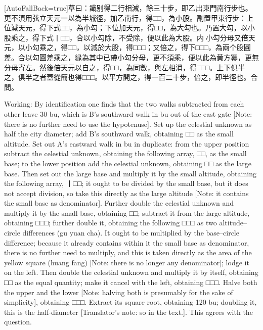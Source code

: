 \documentclass[11pt]{article}
\newcommand{\zhsmall}{\footnotesize\color{black!70}}
\newcommand{\unitlabel}[1]{\marginpar{\raggedleft\tiny\color{gray}#1}}
\newenvironment{unitzh}{\par\CJKfontspec{Noto Serif CJK SC}[AutoFallBack=true]\large\linespread{1.25}\selectfont}{\par}
\newenvironment{uniten}{\par\small\color{black!85}}{\par\medskip}
\begin{document}
\begin{unitzh}\unitlabel{ceyuan-011.31}草曰：識别得二行相減，餘三十步，即乙出東門南行步也。{\zhsmall 更不湏用弦}立天元一以為半城徑，加乙南行，得□□，為小股。副置甲東行步：上位減天元，得下式□□，為小勾；下位加天元，得□□，為大勾也。乃置大勾，以小股乘之，得下式丨□□，合以小勾除，不受除，便以此為大股。{\zhsmall 内𢃄小勾分母}又倍天元，以小勾乘之，得□□，以減於大股，得□□□；又倍之，得下□□□，為兩个股圓差。合以勾圓差乘之，縁為其中已帶小勾分母，更不須乘，便以此為黄方冪，{\zhsmall 更無分母}寄左。然後倍天元以自之，得□□，為同數，與左相消，得□□□。上下俱半之，{\zhsmall 俱半之者蓋從簡也}得□□□。以平方開之，得一百二十步，倍之，即半徑也。合問。\end{unitzh}
\begin{uniten}Working: By identification one finds that the two walks subtracted from each other leave 30 bu, which is B's southward walk in bu out of the east gate [Note: there is no further need to use the hypotenuse]. Set up the celestial unknown as half the city diameter; add B's southward walk, obtaining □□ as the small altitude. Set out A's eastward walk in bu in duplicate: from the upper position subtract the celestial unknown, obtaining the following array, □□, as the small base; to the lower position add the celestial unknown, obtaining □□ as the large base. Then set out the large base and multiply it by the small altitude, obtaining the following array, 丨□□; it ought to be divided by the small base, but it does not accept division, so take this directly as the large altitude [Note: it contains the small base as denominator]. Further double the celestial unknown and multiply it by the small base, obtaining □□; subtract it from the large altitude, obtaining □□□; further double it, obtaining the following □□□ as two altitude–circle differences (gu yuan cha). It ought to be multiplied by the base–circle difference; because it already contains within it the small base as denominator, there is no further need to multiply, and this is taken directly as the area of the yellow square (huang fang) [Note: there is no longer any denominator]; lodge it on the left. Then double the celestial unknown and multiply it by itself, obtaining □□ as the equal quantity; make it cancel with the left, obtaining □□□. Halve both the upper and the lower [Note: halving both is presumably for the sake of simplicity], obtaining □□□. Extract its square root, obtaining 120 bu; doubling it, this is the half-diameter [Translator's note: so in the text.]. This agrees with the question.\end{uniten}
\end{document}
